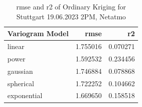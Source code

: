 \begin{table}[ht]
  \centering
  \begin{tabular}{lrr}
  \toprule
  Variogram Model &     \gls{rmse} &       \gls{r2} \\
  \midrule
          linear & 1.755016 & 0.070271 \\
            power & 1.592532 & 0.234456 \\
        gaussian & 1.746884 & 0.078868 \\
        spherical & 1.722252 & 0.104662 \\
      exponential & 1.669650 & 0.158518 \\
  \bottomrule
  \end{tabular}
  \label{tab: areal interpolation ok 2pm netatmo stuttgart}
  \caption{\gls{rmse} and \gls{r2} of Ordinary Kriging for Stuttgart 19.06.2023 2PM, Netatmo}
\end{table}







